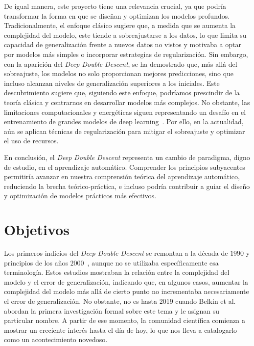 De igual manera, este proyecto tiene una relevancia crucial, ya que podría transformar la forma en que se diseñan y optimizan los modelos profundos. Tradicionalmente, el enfoque clásico sugiere que, a medida que se aumenta la complejidad del modelo, este tiende a sobreajustarse a los datos, lo que limita su capacidad de generalización frente a nuevos datos no vistos y motivaba a optar por modelos más simples o incorporar estrategias de regularización. Sin embargo, con la aparición del \textit{Deep Double Descent}, se ha demostrado que, más allá del sobreajuste, los modelos no solo proporcionan mejores predicciones, sino que incluso alcanzan niveles de generalización superiores a los iniciales. Este descubrimiento sugiere que, siguiendo este enfoque, podríamos prescindir de la teoría clásica y centrarnos en desarrollar modelos más complejos. No obstante, las limitaciones computacionales y energéticas siguen representando un desafío en el entrenamiento de grandes modelos de deep learning~\cite{Thompson2022, Cottier2025, Desislavov2023, Strubell2020}. Por ello, en la actualidad, aún se aplican técnicas de regularización para mitigar el sobreajuste y optimizar el uso de recursos.\newline

En conclusión, el \emph{Deep Double Descent} representa un cambio de paradigma, digno de estudio, en el aprendizaje automático. Comprender los principios subyacentes permitiría avanzar en nuestra comprensión teórica del aprendizaje automático, reduciendo la brecha teórico-práctica, e incluso podría contribuir a guiar el diseño y optimización de modelos prácticos más efectivos.\newline

\section{Objetivos}

Los primeros indicios del \textit{Deep Double Descent} se remontan a la década de $1990$ y principios de los años $2000$~\cite{Vallet1989, Opper2001}, aunque no se utilizaba específicamente esa terminología. Estos estudios mostraban la relación entre la complejidad del modelo y el error de generalización, indicando que, en algunos casos, aumentar la complejidad del modelo más allá de cierto punto no incrementaba necesariamente el error de generalización. No obstante, no es hasta $2019$ cuando Belkin et al.~\cite{Belkin2019} abordan la primera investigación formal sobre este tema y le asignan su particular nombre. A partir de ese momento, la comunidad científica comienza a mostrar un creciente interés hasta el día de hoy, lo que nos lleva a catalogarlo como un acontecimiento novedoso.\newline

